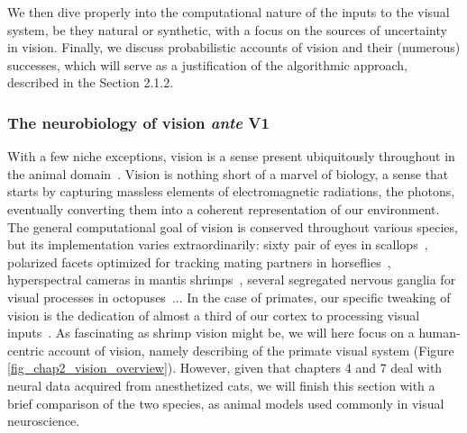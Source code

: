 We then dive properly into the computational nature of the inputs to the visual system, be they natural or synthetic, with a focus on the sources of uncertainty in vision. Finally, we discuss probabilistic accounts of vision and their (numerous) successes, which will serve as a justification of the algorithmic approach, described in the Section 2.1.2.



\subsubsection{The neurobiology of vision \textit{ante} V1}
With a few niche exceptions, vision is a sense present ubiquitously throughout in the animal domain~\cite{land2018eyes}. Vision is nothing short of a marvel of biology, a sense that starts by capturing massless elements of electromagnetic radiations, the photons, eventually converting them into a coherent representation of our environment. The general computational goal of vision is conserved throughout various species, but its implementation varies extraordinarily: sixty pair of eyes in scallops~\cite{palmer2017image}, polarized facets optimized for tracking mating partners in horseflies~\cite{horvath2017horseflies}, hyperspectral cameras in mantis shrimps~\cite{thoen2014different}, several segregated nervous ganglia for visual processes in octopuses~\cite{young1962optic}... In the case of primates, our specific tweaking of vision is the dedication of almost a third of our cortex to processing visual inputs~\cite{kandel2000principles}. As fascinating as shrimp vision might be, we will here focus on a human-centric account of vision, namely describing of the primate visual system (Figure \ref{fig_chap2_vision_overview}). However, given that chapters 4 and 7 deal with neural data acquired from anesthetized cats, we will finish this section with a brief comparison of the two species, as animal models used commonly in visual neuroscience. 

